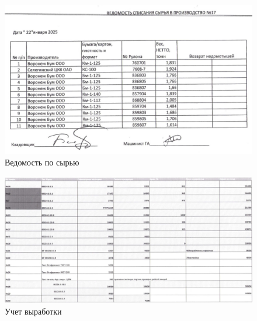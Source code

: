 \begin{figure}
\begin{center}
 \includegraphics[width=\linewidth, height=0.94\textheight, keepaspectratio]{Pics/f26.jpg}
\end{center}
\caption{Ведомость по сырью}
\label{pic:f26}
\end{figure}

\begin{figure}
\begin{center}
 \includegraphics[width=\linewidth, height=0.94\textheight, keepaspectratio]{Pics/f23.jpg}
\end{center}
\caption{Учет выработки}
\label{pic:f23}
\end{figure}

